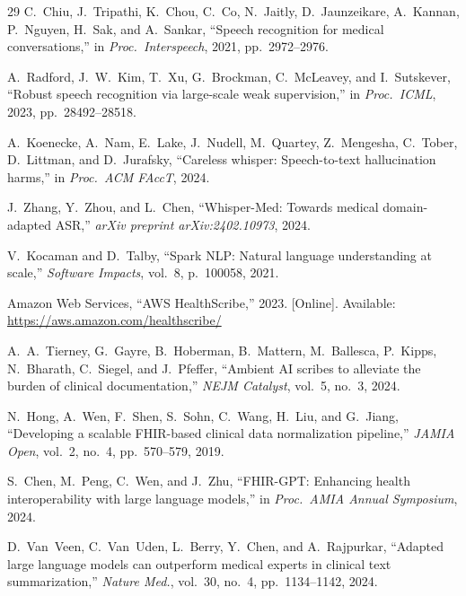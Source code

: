 \documentclass[conference]{IEEEtran}
\begin{document}
\begin{thebibliography}{29}
C.~Chiu, J.~Tripathi, K.~Chou, C.~Co, N.~Jaitly, D.~Jaunzeikare,
A.~Kannan, P.~Nguyen, H.~Sak, and A.~Sankar,
``Speech recognition for medical conversations,''
in \emph{Proc.\ Interspeech}, 2021, pp.~2972--2976.

A.~Radford, J.~W.~Kim, T.~Xu, G.~Brockman, C.~McLeavey, and I.~Sutskever,
``Robust speech recognition via large-scale weak supervision,''
in \emph{Proc.\ ICML}, 2023, pp.~28492--28518.

A.~Koenecke, A.~Nam, E.~Lake, J.~Nudell, M.~Quartey, Z.~Mengesha,
C.~Tober, D.~Littman, and D.~Jurafsky,
``Careless whisper: Speech-to-text hallucination harms,''
in \emph{Proc.\ ACM FAccT}, 2024.

J.~Zhang, Y.~Zhou, and L.~Chen,
``Whisper-Med: Towards medical domain-adapted ASR,''
\emph{arXiv preprint arXiv:2402.10973}, 2024.

V.~Kocaman and D.~Talby,
``Spark NLP: Natural language understanding at scale,''
\emph{Software Impacts}, vol.~8, p.~100058, 2021.

Amazon Web Services,
``AWS HealthScribe,'' 2023. [Online]. Available:
\url{https://aws.amazon.com/healthscribe/}

A.~A.~Tierney, G.~Gayre, B.~Hoberman, B.~Mattern, M.~Ballesca, P.~Kipps,
N.~Bharath, C.~Siegel, and J.~Pfeffer,
``Ambient AI scribes to alleviate the burden of clinical documentation,''
\emph{NEJM Catalyst}, vol.~5, no.~3, 2024.

N.~Hong, A.~Wen, F.~Shen, S.~Sohn, C.~Wang, H.~Liu, and G.~Jiang,
``Developing a scalable FHIR-based clinical data normalization pipeline,''
\emph{JAMIA Open}, vol.~2, no.~4, pp.~570--579, 2019.

S.~Chen, M.~Peng, C.~Wen, and J.~Zhu,
``FHIR-GPT: Enhancing health interoperability with large language models,''
in \emph{Proc.\ AMIA Annual Symposium}, 2024.

D.~Van~Veen, C.~Van~Uden, L.~Berry, Y.~Chen, and A.~Rajpurkar,
``Adapted large language models can outperform medical experts in clinical
text summarization,''
\emph{Nature Med.}, vol.~30, no.~4, pp.~1134--1142, 2024.

\end{thebibliography}
\end{document}
